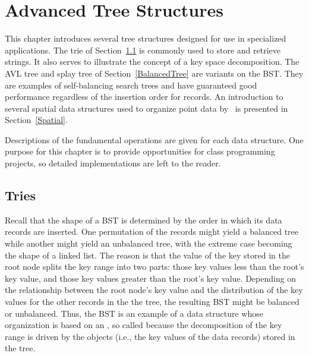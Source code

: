 
\chapter{Advanced Tree Structures}
\label{AdvTree}
\def\CHHEAD{Chap.\ \thechapter\ Advanced Tree Structures}    %

This chapter introduces several tree structures
designed for use in specialized applications.
The trie of Section~\ref{Trie} is commonly used to store
and retrieve strings.
It also serves to illustrate the concept of a key space decomposition.
The AVL tree and splay tree
of Section~\ref{BalancedTree} are variants on the BST.
They are examples of self-balancing search trees
and have guaranteed good performance regardless of the insertion
order for records.
An introduction to several spatial data structures used to organize
point data by \XYcoords\ is presented in
Section~\ref{Spatial}.

Descriptions of the fundamental operations are given for each data
structure.
One purpose for this chapter is to provide opportunities for
class programming projects, so detailed implementations are left
to the reader.

\section{Tries}
\label{Trie}

Recall that the shape of a BST is determined by the order in which its
data records are inserted.
One permutation of the records might yield a balanced tree while
another might yield an unbalanced tree, with the extreme case becoming
the shape of a linked list.
The reason is that the value of the key stored in the root node
splits the key range into two parts: those key values less than the
root's key value, and those key values greater than the root's key
value.
Depending on the relationship between the root node's key value and
the distribution of the key values for the other records in the the
tree, the resulting BST might be balanced or
unbalanced.
Thus, the BST is an example of a data structure whose organization is
based on an
,
so called because the decomposition of the key range is driven by the
objects (i.e., the key values of the data records) stored in the tree.

